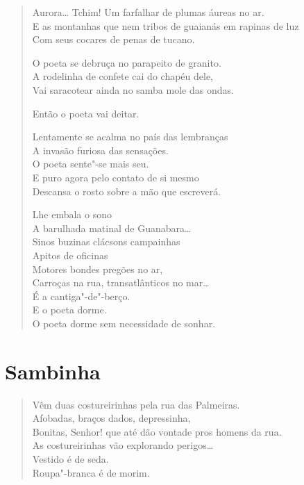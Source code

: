 {\begin{verse}
Aurora\ldots{} Tchim! Um farfalhar de plumas áureas no ar.\\
E as montanhas que nem tribos de guaianás em rapinas de luz\\
Com seus cocares de penas de tucano.

O poeta se debruça no parapeito de granito.\\
A rodelinha de confete cai do chapéu dele,\\
Vai saracotear ainda no samba mole das ondas.

Então o poeta vai deitar.

Lentamente se acalma no país das lembranças\\
A invasão furiosa das sensações.\\
O poeta sente"-se mais seu.\\
E puro agora pelo contato de si mesmo\\
Descansa o rosto sobre a mão que escreverá.

Lhe embala o sono\\
A barulhada matinal de Guanabara\ldots{}\\
Sinos buzinas clácsons campainhas\\
Apitos de oficinas\\
Motores bondes pregões no ar,\\
Carroças na rua, transatlânticos no mar\ldots{}\\
É a cantiga"-de"-berço.\\
E o poeta dorme.\\

O poeta dorme sem necessidade de sonhar.
\end{verse}

\chapter{Sambinha}



\begin{verse}
Vêm duas costureirinhas pela rua das Palmeiras.\\
Afobadas, braços dados, depressinha,\\
Bonitas, Senhor! que até dão vontade pros homens da rua.\\
As costureirinhas vão explorando perigos\ldots{}\\
Vestido é de seda.\\
Roupa"-branca é de morim.


\end{verse}}

